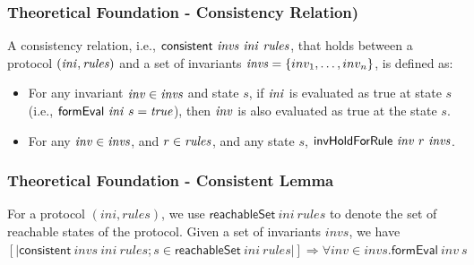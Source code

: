 \documentclass{beamer}
\begin{document}
\begin{frame}\frametitle{Theoretical Foundation - Consistency Relation)}


\begin{definition}
A consistency relation, i.e., $\mathsf{consistent}~ {\it invs} ~{\it ini}~ {\it rules}$,
that holds between a protocol $({\it ini}, {\it rules})$ and
a set of invariants ${\it invs}=\{inv_1,\ldots, inv_n\}$,  is defined as:
%
\begin{itemize}
\item For any invariant ${\it inv} \in {\it invs}$ and state $s$,
if ${\it ini}$ is
evaluated as true at state $s$
(i.e., $\mathsf{formEval}~{\it ini}~s={\it true}$), then ${\it inv}$ is also evaluated as true at the state $s$.

\item For any ${\it inv} \in {\it invs}$,  and $r\in {\it rules}$, and any state $s$,
$\mathsf{invHoldForRule}~{\it inv}~r~{\it invs}$.
\end{itemize}
\end{definition}


\end{frame}




\begin{frame}\frametitle{Theoretical Foundation - Consistent Lemma}

\begin{lemma}\label{consistentLemma}%
For a protocol $( ini,  rules)$,
we use $\mathsf{reachableSet}~   ini~ rules$
to denote the set of reachable states of the protocol.
Given a set of invariants $ invs$,
we have
$[| \mathsf{consistent}~  invs ~ ini~  rules;
  s \in \mathsf{reachableSet}~  ini~rules|]\Longrightarrow
  \forall  inv \in invs. \mathsf{formEval}~ inv ~s$
\end{lemma}
\end{frame}
\end{document}
